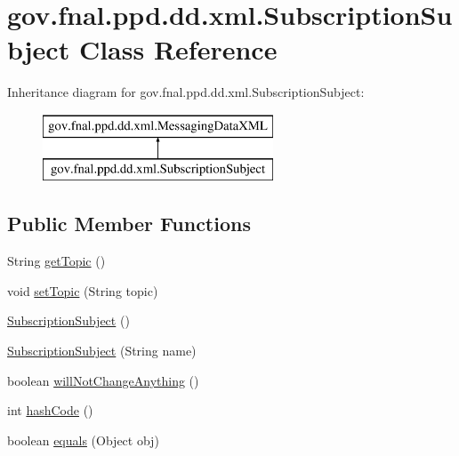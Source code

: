 \hypertarget{classgov_1_1fnal_1_1ppd_1_1dd_1_1xml_1_1SubscriptionSubject}{\section{gov.\-fnal.\-ppd.\-dd.\-xml.\-Subscription\-Subject Class Reference}
\label{classgov_1_1fnal_1_1ppd_1_1dd_1_1xml_1_1SubscriptionSubject}
}
Inheritance diagram for gov.\-fnal.\-ppd.\-dd.\-xml.\-Subscription\-Subject\-:\begin{figure}[H]
\begin{center}
\leavevmode
\includegraphics[height=2.000000cm]{classgov_1_1fnal_1_1ppd_1_1dd_1_1xml_1_1SubscriptionSubject}
\end{center}
\end{figure}
\subsection*{Public Member Functions}
\begin{DoxyCompactItemize}
\item 
String \hyperlink{classgov_1_1fnal_1_1ppd_1_1dd_1_1xml_1_1SubscriptionSubject_a01f2393abc6ac326202690123bda8dad}{get\-Topic} ()
\item 
void \hyperlink{classgov_1_1fnal_1_1ppd_1_1dd_1_1xml_1_1SubscriptionSubject_a83846589b011cc7e49435511dddb598e}{set\-Topic} (String topic)
\item 
\hyperlink{classgov_1_1fnal_1_1ppd_1_1dd_1_1xml_1_1SubscriptionSubject_a01d1baa11a755117fc36d96614a51c22}{Subscription\-Subject} ()
\item 
\hyperlink{classgov_1_1fnal_1_1ppd_1_1dd_1_1xml_1_1SubscriptionSubject_ab9fa2bcb8c215704cd9b51d4e829832c}{Subscription\-Subject} (String name)
\item 
boolean \hyperlink{classgov_1_1fnal_1_1ppd_1_1dd_1_1xml_1_1SubscriptionSubject_aca1d74e3e4b6dccf912b092956c551f8}{will\-Not\-Change\-Anything} ()
\item 
int \hyperlink{classgov_1_1fnal_1_1ppd_1_1dd_1_1xml_1_1SubscriptionSubject_a0c977f51ce1c32fdef687190d23a4ea7}{hash\-Code} ()
\item 
boolean \hyperlink{classgov_1_1fnal_1_1ppd_1_1dd_1_1xml_1_1SubscriptionSubject_af0e768945dc11038a1ae7a298ac328ee}{equals} (Object obj)
\end{DoxyCompactItemize}


